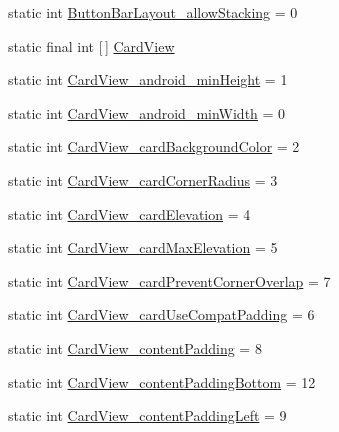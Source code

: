 \begin{DoxyCompactItemize}
\item 
static int \hyperlink{classandroid_1_1support_1_1v7_1_1appcompat_1_1R_1_1styleable_a02f970ac7530c0f3ad36b53abbbeee88}{Button\+Bar\+Layout\+\_\+allow\+Stacking} = 0
\item 
static final int \mbox{[}$\,$\mbox{]} \hyperlink{classandroid_1_1support_1_1v7_1_1appcompat_1_1R_1_1styleable_aee2dd81febffbeeaeff51a35af0f87ec}{Card\+View}
\item 
static int \hyperlink{classandroid_1_1support_1_1v7_1_1appcompat_1_1R_1_1styleable_acbe23eef77b0ab688155935b67bf9ba8}{Card\+View\+\_\+android\+\_\+min\+Height} = 1
\item 
static int \hyperlink{classandroid_1_1support_1_1v7_1_1appcompat_1_1R_1_1styleable_a4475e3438710b97d8efe5f8c93b698eb}{Card\+View\+\_\+android\+\_\+min\+Width} = 0
\item 
static int \hyperlink{classandroid_1_1support_1_1v7_1_1appcompat_1_1R_1_1styleable_acb24166fe6ace1e27e74e078d21add57}{Card\+View\+\_\+card\+Background\+Color} = 2
\item 
static int \hyperlink{classandroid_1_1support_1_1v7_1_1appcompat_1_1R_1_1styleable_aeaecb06443390ab0adc287eaf8376de8}{Card\+View\+\_\+card\+Corner\+Radius} = 3
\item 
static int \hyperlink{classandroid_1_1support_1_1v7_1_1appcompat_1_1R_1_1styleable_ae06791ca725d44a4ad44afc35ef9fd36}{Card\+View\+\_\+card\+Elevation} = 4
\item 
static int \hyperlink{classandroid_1_1support_1_1v7_1_1appcompat_1_1R_1_1styleable_a8c5ed09c377e83d942b47c13e8f01e50}{Card\+View\+\_\+card\+Max\+Elevation} = 5
\item 
static int \hyperlink{classandroid_1_1support_1_1v7_1_1appcompat_1_1R_1_1styleable_ad6fbcf3bd5eaf04f6d84e580634fbbda}{Card\+View\+\_\+card\+Prevent\+Corner\+Overlap} = 7
\item 
static int \hyperlink{classandroid_1_1support_1_1v7_1_1appcompat_1_1R_1_1styleable_a1a6356bd6696f8ac7e1e285c83dd4fe4}{Card\+View\+\_\+card\+Use\+Compat\+Padding} = 6
\item 
static int \hyperlink{classandroid_1_1support_1_1v7_1_1appcompat_1_1R_1_1styleable_a36926c090c4a75eb729564a1baa98a51}{Card\+View\+\_\+content\+Padding} = 8
\item 
static int \hyperlink{classandroid_1_1support_1_1v7_1_1appcompat_1_1R_1_1styleable_ad74f332eb543e2022b522e83a8f03c3a}{Card\+View\+\_\+content\+Padding\+Bottom} = 12
\item 
static int \hyperlink{classandroid_1_1support_1_1v7_1_1appcompat_1_1R_1_1styleable_addee01cbb7403da18fb72955d0892654}{Card\+View\+\_\+content\+Padding\+Left} = 9

\end{DoxyCompactItemize}
